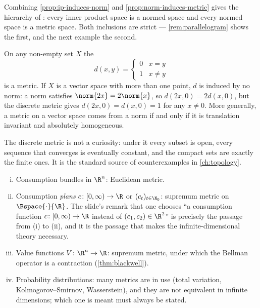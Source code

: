 Combining \autoref{prop:ip-induces-norm} and \autoref{prop:norm-induces-metric}
gives the hierarchy of \autocite[slide 25]{fukuda2026analysis}: every inner
product space is a normed space and every normed space is a metric space. Both
inclusions are strict --- \autoref{rem:parallelogram} shows the first, and the
next example the second.

\begin{eg}\label{eg:discrete-metric}
	On any non-empty set $X$ the 
	\[
		d(x,y)=\begin{cases}0 & x=y\\ 1 & x\neq y\end{cases}
	\]
	is a metric. If $X$ is a vector space with more than one point, $d$ is induced
	by no norm: a norm satisfies $\norm{2x}=2\norm{x}$, so
	$d(2x,0)=2d(x,0)$, but the discrete metric gives $d(2x,0)=d(x,0)=1$ for any
	$x\neq0$. More generally, a metric on a vector space comes from a norm if and
	only if it is translation invariant and absolutely homogeneous.

	The discrete metric is not a curiosity: under it every subset is open, every
	sequence that converges is eventually constant, and the compact sets are exactly
	the finite ones. It is the standard source of counterexamples in
	\autoref{ch:topology}.
\end{eg}

\begin{eg}\label{eg:econ-metrics}
	\begin{enumerate}[(i)]
		\item Consumption bundles in $\R^n$: Euclidean metric.
		\item Consumption \emph{plans} $c\colon[0,\infty)\to\R$ or
		      $(c_t)_{t\in\N_0}$: supremum metric on $\Bspace{\cdot}{\R}$. The slide's
		      remark that one chooses ``a consumption function
		      $c\colon[0,\infty)\to\R$ instead of $(c_1,c_2)\in\R^2$''
		      \autocite[slide 4]{fukuda2026analysis} is precisely the passage from (i)
		      to (ii), and it is the passage that makes the infinite-dimensional theory
		      necessary.
		\item Value functions $V\colon\R^n\to\R$: supremum metric, under which the
		      Bellman operator is a contraction (\autoref{thm:blackwell}).
		\item Probability distributions: many metrics are in use (total variation,
		      Kolmogorov--Smirnov, Wasserstein), and they are not equivalent in infinite
		      dimensions; which one is meant must always be stated.
	\end{enumerate}
\end{eg}

